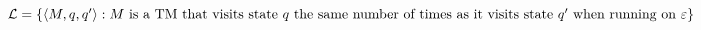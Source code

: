 $\mathcal{L} = \{\langle M, q, q' \rangle : M \text{ is a TM that visits state } q \\ \text{ the same number of times
        as it visits state } q' \text{ when running on } \varepsilon\}$ \\
